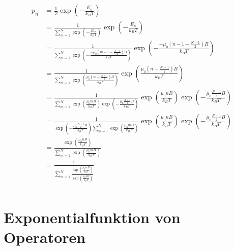 \documentclass[a4paper,11pt]{article}
\begin{document}
\begin{equation}
\begin{aligned}
p_n &= \frac{1}{Z} \exp \left( -\frac{E_n}{k_B T} \right) \\
    &= \frac{1}{\sum_{m=1}^N \exp \left( -\frac{E_m}{k_B T} \right)} \exp \left( -\frac{E_n}{k_B T} \right) \\
    &= \frac{1}{\sum_{m=1}^N \exp \left( -\frac{-\mu_0 \left( m-1-\frac{N-1}{2} \right) B }{k_B T} \right)} \exp \left( -\frac{-\mu_0 \left( n-1-\frac{N-1}{2} \right) B}{k_B T} \right) \\
    &= \frac{1}{\sum_{m=1}^N \exp \left( \frac{\mu_0 \left( m-\frac{N+1}{2} \right) B }{k_B T} \right)} \exp \left( \frac{\mu_0 \left( n-\frac{N+1}{2} \right) B}{k_B T} \right) \\
    &= \frac{1}{\sum_{m=1}^N \exp \left( \frac{\mu_0 m B }{k_B T} \right)\exp \left( -\frac{\mu_0 \frac{N+1}{2} B }{k_B T} \right)} \exp \left( \frac{\mu_0 n B }{k_B T} \right)\exp \left( -\frac{\mu_0 \frac{N+1}{2} B }{k_B T} \right) \\
    &= \frac{1}{\exp \left( -\frac{\mu_0 \frac{N+1}{2} B }{k_B T} \right)\sum_{m=1}^N \exp \left( \frac{\mu_0 m B }{k_B T} \right)} \exp \left( \frac{\mu_0 n B }{k_B T} \right)\exp \left( -\frac{\mu_0 \frac{N+1}{2} B }{k_B T} \right) \\
    &= \frac{\exp \left( \frac{\mu_0 n B }{k_B T} \right)}{\sum_{m=1}^N \exp \left( \frac{\mu_0 m B }{k_B T} \right)} \\
    &= \frac{1}{\sum_{m=1}^N \frac{ \exp \left( \frac{\mu_0 m B }{k_B T} \right)}{ \exp \left( \frac{\mu_0 n B }{k_B T} \right)} } \\
\end{aligned}
\end{equation}

\subsection{}

\subsection{}

\subsection{}

\section{Exponentialfunktion von Operatoren}

\subsection{}

\subsection{}

\subsection{}
\end{document}

